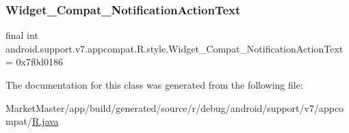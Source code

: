 \mbox{\label{classandroid_1_1support_1_1v7_1_1appcompat_1_1R_1_1style_a18e9124d71139940e68076f3be26805b}} 
\subsubsection{\texorpdfstring{Widget\+\_\+\+Compat\+\_\+\+Notification\+Action\+Text}{Widget\_Compat\_NotificationActionText}}
{\footnotesize\ttfamily final int android.\+support.\+v7.\+appcompat.\+R.\+style.\+Widget\+\_\+\+Compat\+\_\+\+Notification\+Action\+Text = 0x7f0d0186\hspace{0.3cm}{\ttfamily [static]}}



The documentation for this class was generated from the following file\+:\begin{DoxyCompactItemize}
\item 
Market\+Master/app/build/generated/source/r/debug/android/support/v7/appcompat/\mbox{\hyperlink{debug_2android_2support_2v7_2appcompat_2R_8java}{R.\+java}}\end{DoxyCompactItemize}
